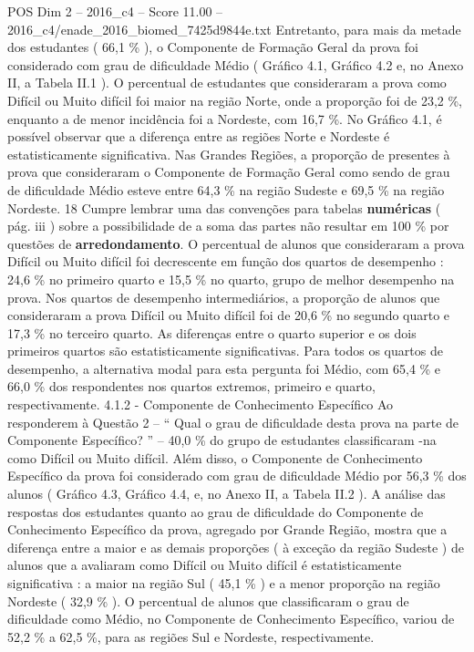 \begin{textsample}{POS Dim 2 – 2016\_c4 – Score 11.00 – 2016\_c4/enade\_2016\_biomed\_7425d9844e.txt}
Entretanto, para mais da metade dos estudantes ( 66,1 \% ), o Componente de Formação Geral da prova foi considerado com grau de dificuldade Médio ( Gráfico 4.1, Gráfico 4.2 e, no Anexo II, a Tabela II.1 ).
O percentual de estudantes que consideraram a prova como Difícil ou Muito difícil foi maior na região Norte, onde a proporção foi de 23,2 \%, enquanto a de menor incidência foi a Nordeste, com 16,7 \%.
No Gráfico 4.1, é possível observar que a diferença entre as regiões Norte e Nordeste é estatisticamente significativa.
Nas Grandes Regiões, a proporção de presentes à prova que consideraram o Componente de Formação Geral como sendo de grau de dificuldade Médio esteve entre 64,3 \% na região Sudeste e 69,5 \% na região Nordeste. 18 Cumpre lembrar uma das convenções para tabelas \textbf{numéricas} ( pág. iii ) sobre a possibilidade de a soma das partes não resultar em 100 \% por questões de \textbf{arredondamento}.
O percentual de alunos que consideraram a prova Difícil ou Muito difícil foi decrescente em função dos quartos de desempenho : 24,6 \% no primeiro quarto e 15,5 \% no quarto, grupo de melhor desempenho na prova.
Nos quartos de desempenho intermediários, a proporção de alunos que consideraram a prova Difícil ou Muito difícil foi de 20,6 \% no segundo quarto e 17,3 \% no terceiro quarto.
As diferenças entre o quarto superior e os dois primeiros quartos são estatisticamente significativas.
Para todos os quartos de desempenho, a alternativa modal para esta pergunta foi Médio, com 65,4 \% e 66,0 \% dos respondentes nos quartos extremos, primeiro e quarto, respectivamente. 4.1.2 - Componente de Conhecimento Específico Ao responderem à Questão 2 – “ Qual o grau de dificuldade desta prova na parte de Componente Específico? ” – 40,0 \% do grupo de estudantes classificaram -na como Difícil ou Muito difícil.
Além disso, o Componente de Conhecimento Específico da prova foi considerado com grau de dificuldade Médio por 56,3 \% dos alunos ( Gráfico 4.3, Gráfico 4.4, e, no Anexo II, a Tabela II.2 ).
A análise das respostas dos estudantes quanto ao grau de dificuldade do Componente de Conhecimento Específico da prova, agregado por Grande Região, mostra que a diferença entre a maior e as demais proporções ( à exceção da região Sudeste ) de alunos que a avaliaram como Difícil ou Muito difícil é estatisticamente significativa : a maior na região Sul ( 45,1 \% ) e a menor proporção na região Nordeste ( 32,9 \% ).
O percentual de alunos que classificaram o grau de dificuldade como Médio, no Componente de Conhecimento Específico, variou de 52,2 \% a 62,5 \%, para as regiões Sul e Nordeste, respectivamente.

\end{textsample}

